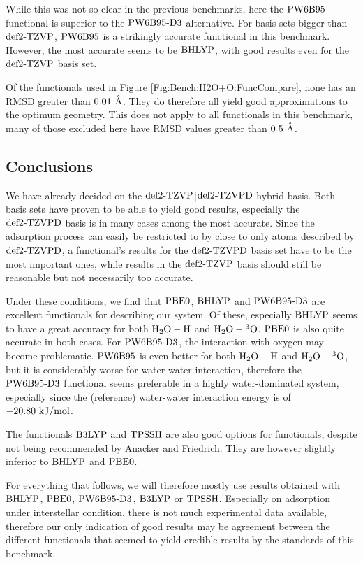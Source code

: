 \documentclass[8.5pt,twoside,twocolumn]{article}
\renewcommand{\Ang}{\mathring{\te{A}}}
\newcommand\kmo{\enmat{\te {kJ/mol}}}
\theoremstyle{standard}
\begin{document}
While this was not so clear in the previous benchmarks, here the $\text{PW6B95}$
functional is superior to the $\text{PW6B95}\text{-D3}$ alternative. For basis sets
bigger than $\text{def2-TZVP}$, $\text{PW6B95}$ is a strikingly accurate functional in this benchmark.
However, the most accurate seems to be $\text{BHLYP}$, with good results even for
the $\text{def2-TZVP}$ basis set.

Of the functionals used in Figure \ref{Fig:Bench:H2O+O:FuncCompare}, none
has an RMSD greater than $0.01\ \Ang$. They do therefore all yield good
approximations to the optimum geometry. This does not apply to all functionals
in this benchmark, many of those excluded here have RMSD values greater
than $0.5\ \Ang$. 

\subsection{Conclusions}

We have already decided on the $\text{def2-TZVP}$|$\text{def2-TZVPD}$ hybrid basis. Both basis sets
have proven to be able to yield good results, especially the $\text{def2-TZVPD}$ basis
is in many cases among the most accurate. Since the adsorption process 
can easily be restricted to by close to only atoms described by $\text{def2-TZVPD}$,
a functional's results for the $\text{def2-TZVPD}$ basis set have to be the most important
ones, while results in the $\text{def2-TZVP}$ basis should still be reasonable but not
necessarily too accurate.

Under these conditions, we find that $\text{PBE0}$, $\text{BHLYP}$ and $\text{PW6B95}\text{-D3}$ are excellent
functionals for describing our system. Of these, especially $\text{BHLYP}$ seems
to have a great accuracy for both $\mbox{\ensuremath{\text H _2 \text O-\text H}}$ and $\mbox{\ensuremath{\text H _2 \text O-\hspace{.2pt} ^3\text{O}}}$. $\text{PBE0}$ is also
quite accurate in both cases. For $\text{PW6B95}\text{-D3}$, the interaction with oxygen
may become problematic. $\text{PW6B95}$ is even better for both $\mbox{\ensuremath{\text H _2 \text O-\text H}}$ and $\mbox{\ensuremath{\text H _2 \text O-\hspace{.2pt} ^3\text{O}}}$,
but it is considerably worse for water-water interaction, therefore the $\text{PW6B95}\text{-D3}$
functional seems preferable in a highly water-dominated system, especially
since the (reference) water-water interaction energy is of $-20.80\ \kmo$.

The functionals $\text{B3LYP}$ and $\text{TPSSH}$ are also good options for functionals,
despite not being recommended by Anacker and Friedrich\cite{Anacker2014}.
They are however slightly inferior to $\text{BHLYP}$ and $\text{PBE0}$.

For everything that follows, we will therefore mostly use results obtained
with $\text{BHLYP}$, $\text{PBE0}$, $\text{PW6B95}\text{-D3}$, $\text{B3LYP}$ or $\text{TPSSH}$. Especially on
adsorption under interstellar condition, there is not much experimental
data available, therefore our only indication of good results may be
agreement between the different functionals that seemed to yield credible results
by the standards of this benchmark.
  
\end{document}
